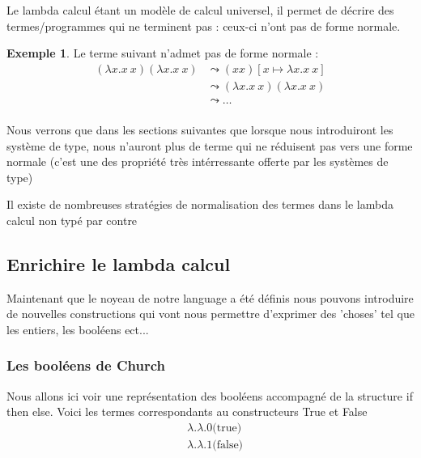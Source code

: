 \documentclass {article}
\theoremstyle{definition}
\newtheorem{example}{Exemple}
\theoremstyle{remark}
\begin{document}
Le lambda calcul étant un modèle de calcul universel, il permet de 
décrire des termes/programmes qui ne terminent pas : ceux-ci n'ont pas 
de forme normale.

\begin{example}
 
  Le terme suivant n'admet pas de forme normale :
  \begin{align*}
  (\lambda x. x\: x) (\lambda x. x\: x) &\leadsto (x x)[x \mapsto \lambda x. x\: x] \\
                                        &\leadsto (\lambda x. x\: x) (\lambda x. x\: x) \\
                                        &\leadsto \ldots \\
  \end{align*}
\end{example}
Nous verrons que dans les sections suivantes que lorsque nous introduiront 
les système de type, nous n'auront plus de terme qui ne réduisent pas vers 
une forme normale (c'est une des propriété très intérressante offerte par 
les systèmes de type)

Il existe de nombreuses stratégies de normalisation des termes dans le lambda 
calcul non typé %
par contre



\subsection{Enrichire le lambda calcul}

Maintenant que le noyeau de notre language a été définis nous pouvons introduire
de nouvelles constructions qui vont nous permettre d'exprimer des 'choses' %
tel que les entiers, les booléens ect...

\subsubsection{Les booléens de Church}

Nous allons ici voir une représentation des booléens accompagné de la 
structure if then else.
Voici les termes correspondants au constructeurs True et False
\begin{align*}
  &\lambda .\lambda . 0 \mbox{(true)} \\
  &\lambda .\lambda . 1 \mbox{(false)} 
\end{align*}
\end{document}
